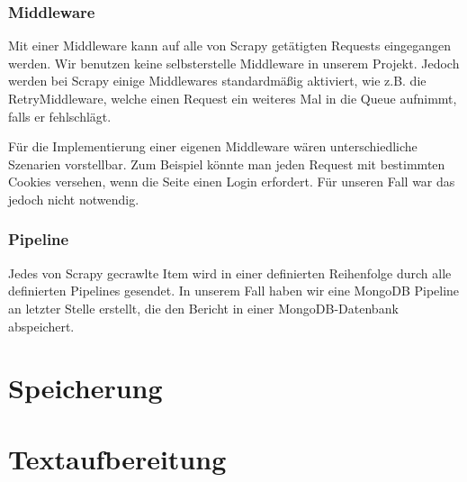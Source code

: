 \documentclass[chapterprefix=false, 12pt, a4paper, oneside, parskip=half, listof=totoc, bibliography=totoc, numbers=noendperiod]{scrbook}
\begin{document}
    \subsection{Middleware}

    Mit einer Middleware kann auf alle von Scrapy getätigten Requests eingegangen werden. Wir benutzen keine selbsterstelle
    Middleware in unserem Projekt. Jedoch werden bei Scrapy einige Middlewares standardmäßig aktiviert, wie z.B.
    die RetryMiddleware, welche einen Request ein weiteres Mal in die Queue aufnimmt, falls er fehlschlägt.

    Für die Implementierung einer eigenen Middleware wären unterschiedliche Szenarien vorstellbar. Zum Beispiel könnte man
    jeden Request mit bestimmten Cookies versehen, wenn die Seite einen Login erfordert. Für unseren Fall war das jedoch nicht
    notwendig.

    \subsection{Pipeline}

    Jedes von Scrapy gecrawlte Item wird in einer definierten Reihenfolge durch alle definierten Pipelines gesendet.
    In unserem Fall haben wir eine MongoDB Pipeline an letzter Stelle erstellt, die den Bericht in einer MongoDB-Datenbank abspeichert.


	\chapter{Speicherung}
	\chapter{Textaufbereitung}




\end{document}
